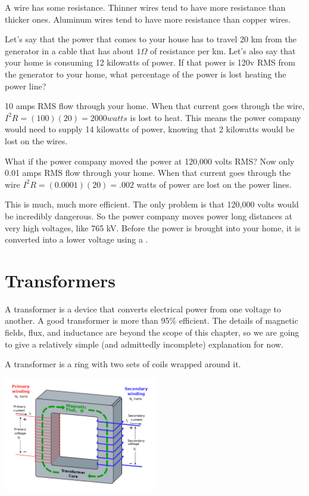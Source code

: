 A wire has some resistance. Thinner wires tend to have more resistance
than thicker ones. Aluminum wires tend to have more resistance than
copper wires.

Let's say that the power that comes to your house has to travel 20 km
from the generator in a cable that has about $1 \Omega$ of resistance
per km.  Let's also say that your home is consuming 12 kilowatts of power. If that power is 120v RMS from the generator to your home, what
percentage of the power is lost heating the power line? 

10 amps RMS flow through your home. When that current goes through the wire, $I^2
R = (100)(20) = 2000 watts$ is lost to heat. This means the power company would need to supply 14 kilowatts of power,
knowing that 2 kilowatts would be lost on the wires.

What if the power company moved the power at 120,000 volts RMS? Now
only 0.01 amps RMS flow through your home. When that current goes
through the wire $I^2R = (0.0001)(20) = .002$ watts of power are lost
on the power lines.

This is much, much more efficient. The only problem is that 120,000 volts
would be incredibly dangerous.  So the power company moves power long
distances at very high voltages, like 765 kV.  Before the power is
brought into your home, it is converted into a lower voltage using a
.

\section{Transformers}

A transformer is a device that converts electrical power from one
voltage to another. A good transformer is more than 95\% efficient. The
details of magnetic fields, flux, and inductance are beyond the scope
of this chapter, so we are going to give a relatively simple (and admittedly incomplete) explanation for now.

A transformer is a ring with two sets of coils wrapped around it.

\includegraphics[width=0.5\textwidth]{transformer.png}

